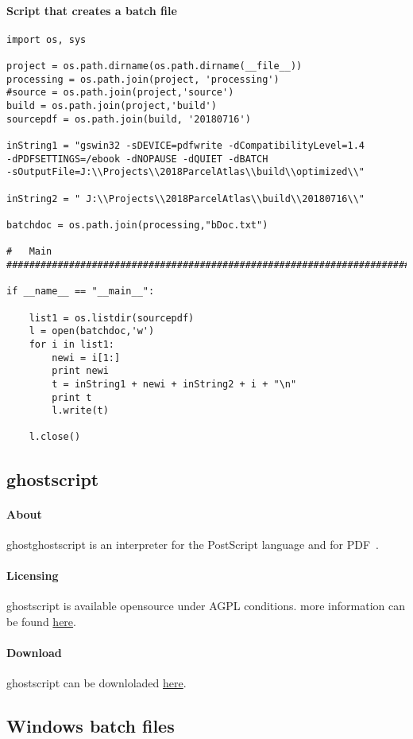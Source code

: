 \documentclass[class=article , crop=false, titlepage, twoside, multi={itemize, figure, verbatim}, float=false]{standalone}
\begin{document}
\paragraph{Script that creates a batch file}
\begin{verbatim}
import os, sys

project = os.path.dirname(os.path.dirname(__file__))
processing = os.path.join(project, 'processing')
#source = os.path.join(project,'source')
build = os.path.join(project,'build')
sourcepdf = os.path.join(build, '20180716')

inString1 = "gswin32 -sDEVICE=pdfwrite -dCompatibilityLevel=1.4 
-dPDFSETTINGS=/ebook -dNOPAUSE -dQUIET -dBATCH 
-sOutputFile=J:\\Projects\\2018ParcelAtlas\\build\\optimized\\"

inString2 = " J:\\Projects\\2018ParcelAtlas\\build\\20180716\\"

batchdoc = os.path.join(processing,"bDoc.txt")

#   Main
################################################################################

if __name__ == "__main__":

    list1 = os.listdir(sourcepdf)
    l = open(batchdoc,'w')
    for i in list1:
        newi = i[1:]
        print newi
        t = inString1 + newi + inString2 + i + "\n"
        print t
        l.write(t)

    l.close()

\end{verbatim}

\subsection{ghostscript}

\paragraph{About}
ghostghostscript is an interpreter for the PostScript language and for PDF~\cite{ghostscript1}.
\paragraph{Licensing}
ghostscript is available opensource under AGPL conditions.  more information can be found \href{https://www.ghostscript.com/license.html}{here}.
\paragraph{Download}
ghostscript can be downloladed \href{https://www.ghostscript.com/download/gsdnld.html}{here}.


\subsection{Windows batch files}
\end{document}
